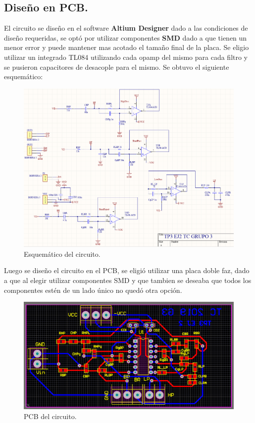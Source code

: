 \subsection{Diseño en PCB.}
El circuito se diseño en el software \textbf{Altium Designer} dado a las condiciones de diseño requeridas, se optó por utilizar componentes \textbf{SMD} dado a que tienen un menor error y puede mantener mas acotado el tamaño final de la placa.
Se eligio utilizar un integrado TL084 utilizando cada opamp del mismo  para cada filtro y se pusieron capacitores de desacople para el mismo. Se obtuvo el siguiente esquemático:
\begin{figure}[H]	
	\centering
	\includegraphics[width=\textwidth]{ImagenesEj2/esquematico.PNG}
	\caption{Esquemático del circuito.}
	\label{fig:esq}
\end{figure}
Luego se diseño el circuito en el PCB, se eligió utilizar una placa doble faz, dado a que al elegir utilizar componentes SMD y que tambien se deseaba que todos los componentes estén de un lado único no quedó otra opción.
\begin{figure}[H]	
	\centering
	\includegraphics[width=\textwidth]{ImagenesEj2/pcb.PNG}
	\caption{PCB del circuito.}
	\label{fig:pcb}
\end{figure}
%
